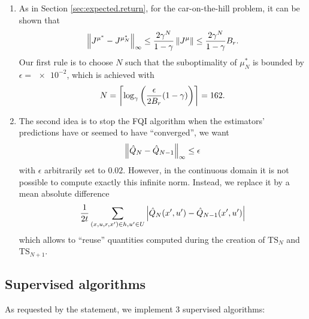 \documentclass[a4paper, 12pt]{article}
\begin{document}
    \begin{enumerate}
        \item As in Section \ref{sec:expected.return}, for the car-on-the-hill problem, it can be shown \cite{ernstinfo8003, rozet2021suboptimality} that
            \begin{equation}
                \left\|J^{\mu^*} - J^{\mu^*_N}\right\|_\infty \leq \frac{2 \gamma^N}{1 - \gamma} \left\|J^\mu\right\| \leq \frac{2 \gamma^N}{1 - \gamma} B_r .
            \end{equation}
            Our first rule is to choose $N$ such that the suboptimality of $\mu^*_N$ is bounded by $\epsilon = \num{e-2}$, which is achieved with
            \begin{equation}
                N = \left\lceil \log_{\gamma} \left(\frac{\epsilon}{2 B_r}(1-\gamma)\right) \right\rceil = \num{162} .
            \end{equation}
        \item The second idea is to stop the FQI algorithm when the estimators' predictions have or seemed to have \enquote{converged}, \ie{} we want
        \begin{equation}
            \left\|\hat{Q}_N - \hat{Q}_{N - 1}\right\|_\infty \leq \epsilon
        \end{equation}
        with $\epsilon$ arbitrarily set to $0.02$. However, in the continuous domain it is not possible to compute exactly this infinite norm. Instead, we replace it by a mean absolute difference
        \begin{equation}\label{eq:mad}
            \frac{1}{2 t} \sum_{(x, u, r, x') \in h, u' \in U} \left|\hat{Q}_N(x', u') - \hat{Q}_{N-1}(x', u')\right|
        \end{equation}
        which allows to \enquote{reuse} quantities computed during the creation of $\text{TS}_N$ and $\text{TS}_{N+1}$.
    \end{enumerate}
    
    \subsection{Supervised algorithms}\label{sec:supervised.algorithms}
    
    As requested by the statement, we implement 3 supervised algorithms:
    
\end{document}
